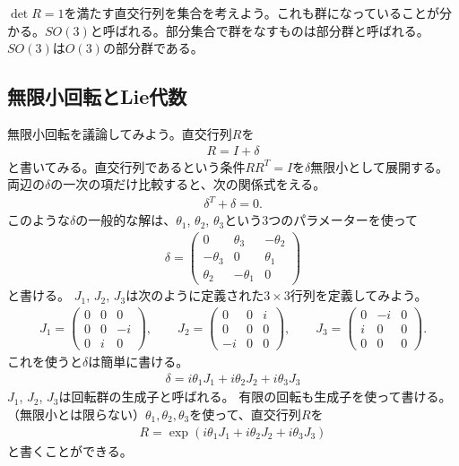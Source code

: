 \documentclass[10pt,a4paper]{jarticle}
\begin{document}
$\det R=1$を満たす直交行列を集合を考えよう。これも群になっていることが分かる。$SO(3)$と呼ばれる。部分集合で群をなすものは部分群と呼ばれる。$SO(3)$は$O(3)$の部分群である。




\subsection{無限小回転とLie代数}
無限小回転を議論してみよう。直交行列$R$を
\begin{align}
R = I + \delta
\end{align}
と書いてみる。直交行列であるという条件$R R^T = I$を$\delta$無限小として展開する。
両辺の$\delta$の一次の項だけ比較すると、次の関係式をえる。
\begin{align}
\delta^T + \delta = 0. \label{eq:SO3 small rotation}
\end{align}
このような$\delta$の一般的な解は、$\theta_1$, $\theta_2$, $\theta_3$という3つのパラメーターを使って
\begin{align}
\delta = \left(\begin{array}{ccc}
0 & \theta_3 & -\theta_2 \\
-\theta_3 & 0 & \theta_1 \\
\theta_2 & -\theta_1 & 0
\end{array}\right) \label{eq:SO3 small rotation2}
\end{align}
と書ける。
$J_1$, $J_2$, $J_3$は次のように定義された$3\times 3$行列を定義してみよう。
\begin{align}
J_1 = \left(\begin{array}{ccc}
0 & 0 & 0 \\
0 & 0 & -i\\
0 & i & 0
\end{array}\right), \qquad
%
J_2 = \left(\begin{array}{ccc}
0 & 0 & i\\
 0 & 0 & 0 \\
-i & 0 & 0
\end{array}\right), \qquad
%
J_3 = \left(\begin{array}{ccc}
0 & -i & 0 \\
i & 0 & 0 \\
0 & 0 & 0 
\end{array}\right).\label{eq:SO3 generator matrix}
\end{align}
これを使うと$\delta$は簡単に書ける。
\begin{align}
\delta = i \theta_1 J_1 + i \theta_2 J_2 + i \theta_3 J_3 \label{eq:SO3 generator}
\end{align}
$J_1$, $J_2$, $J_3$は回転群の生成子と呼ばれる。
%
有限の回転も生成子を使って書ける。（無限小とは限らない）$\theta_1, \theta_2, \theta_3$を使って、直交行列$R$を
\begin{align}
R = \exp\left( i \theta_1 J_1 + i \theta_2 J_2 + i\theta_3 J_3 \right)
\end{align}
と書くことができる。
\end{document}
